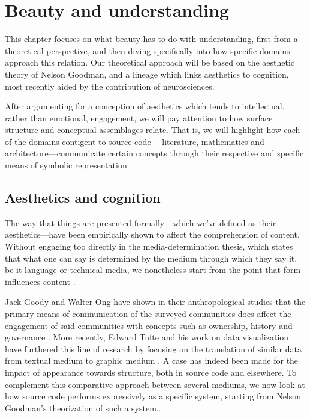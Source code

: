 \chapter{Beauty and understanding}
\label{chap:beauty}


This chapter focuses on what beauty has to do with understanding, first from a theoretical perspective, and then diving specifically into how specific domains approach this relation. Our theoretical approach will be based on the aesthetic theory of Nelson Goodman, and a lineage which links aesthetics to cognition, most recently aided by the contribution of neurosciences.  

After argumenting for a conception of aesthetics which tends to intellectual, rather than emotional, engagement, we will pay attention to how surface structure and conceptual assemblages relate. That is, we will highlight how each of the domains contigent to source code— literature, mathematics and architecture—communicate certain concepts through their respective and specific means of symbolic representation. 

\section{Aesthetics and cognition}
\label{sec:aesthetic-cognition}


The way that things are presented formally—which we've defined as their aesthetics—have been empirically shown to affect the comprehension of content. Without engaging too directly in the media-determination thesis, which states that what one can say is determined by the medium through which they say it, be it language or technical media, we nonetheless start from the point that form influences content \citep{postman_amusing_1985}. 

Jack Goody and Walter Ong have shown in their anthropological studies that the primary means of communication of the surveyed communities does affect the engagement of said communities with concepts such as ownership, history and governance \citep{ong_orality_2012,goody_logic_1986}. More recently, Edward Tufte and his work on data visualization have furthered this line of research by focusing on the translation of similar data from textual medium to graphic medium \citep{tufte_visual_2001}. A case has indeed been made for the impact of appearance towards structure, both in source code and elsewhere. To complement this comparative approach between several mediums, we now look at how source code performs expressively as a specific system, starting from Nelson Goodman's theorization of such a system..

